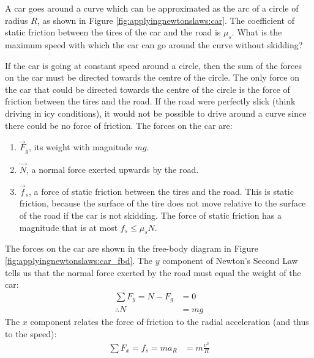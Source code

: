 \begin{example}{
\label{ex:applyingnewtonslaws:car}A car goes around a curve which can be approximated as the arc of a circle of radius $R$, as shown in Figure \ref{fig:applyingnewtonslaws:car}. The coefficient of static friction between the tires of the car and the road is $\mu_s$. What is the maximum speed with which the car can go around the curve without skidding? }

If the car is going at constant speed around a circle, then the sum of the forces on the car must be directed towards the centre of the circle. The only force on the car that could be directed towards the centre of the circle is the force of friction between the tires and the road. If the road were perfectly slick (think driving in icy conditions), it would not be possible to drive around a curve since there could be no force of friction. The forces on the car are:
\begin{enumerate}
\item $\vec F_g$, its weight with magnitude $mg$.
\item $\vec N$, a normal force exerted upwards by the road.
\item $\vec f_s$, a force of static friction between the tires and the road. This is static friction, because the surface of the tire does not move relative to the surface of the road if the car is not skidding. The force of static friction has a magnitude that is at most $f_s\leq\mu_sN$.
\end{enumerate}
The forces on the car are shown in the free-body diagram in Figure \ref{fig:applyingnewtonslaws:car_fbd}.
The $y$ component of Newton's Second Law tells us that the normal force exerted by the road must equal the weight of the car:
\begin{align*}
\sum F_y = N-F_g&=0\\
\therefore N &=mg
\end{align*}
The $x$ component relates the force of friction to the radial acceleration (and thus to the speed):
\begin{align*}
\sum F_x = f_s =ma_R&=m\frac{v^2}{R}\\

\end{align*}
\end{example}
